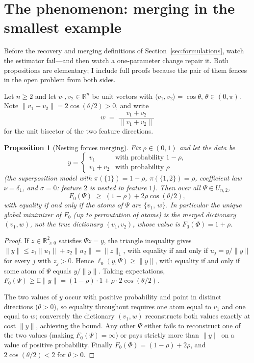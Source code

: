 \documentclass[11pt]{amsart}
\theoremstyle{plain}
\newtheorem{proposition}[theorem]{Proposition}
\theoremstyle{definition}
\newcommand{\R}{\mathbb{R}}
\newcommand{\E}{\mathbb{E}}
\begin{document}
\section{The phenomenon: merging in the smallest example}\label{sec:phenomenon}

Before the recovery and merging definitions of Section~\ref{sec:formulations}, watch the estimator fail---and then watch a one-parameter change repair it. Both propositions are elementary; I include full proofs because the pair of them fences in the open problem from both sides.

Let $n\ge2$ and let $v_1,v_2\in\R^n$ be unit vectors with $\langle v_1,v_2\rangle=\cos\theta$, $\theta\in(0,\pi)$. Note $\|v_1+v_2\| = 2\cos(\theta/2) > 0$, and write
\[
  w\;=\;\frac{v_1+v_2}{\lVert v_1+v_2\rVert}
\]
for the unit bisector of the two feature directions.

\begin{proposition}[Nesting forces merging]\label{prop:merge}
Fix $\rho\in(0,1)$ and let the data be
\[
  y=\begin{cases} v_1 & \text{with probability } 1-\rho,\\ v_1+v_2 & \text{with probability } \rho \end{cases}
\]
(the superposition model with $\pi(\{1\})=1-\rho$, $\pi(\{1,2\})=\rho$, coefficient law $\nu=\delta_1$, and $\sigma=0$: feature $2$ is nested in feature $1$). Then over all $\Psi\in U_{n,2}$,
\[
  F_0(\Psi)\;\ge\;(1-\rho)+2\rho\cos(\theta/2),
\]
with equality if and only if the atoms of $\Psi$ are $\{v_1,\,w\}$. In particular the unique global minimizer of $F_0$ (up to permutation of atoms) is the \emph{merged} dictionary $(v_1,w)$, not the true dictionary $(v_1,v_2)$, whose value is $F_0(\Phi)=1+\rho$.
\end{proposition}

\begin{proof}
If $z\in\R^2_{\ge0}$ satisfies $\Psi z=y$, the triangle inequality gives $\lVert y\rVert\le z_1\lVert u_1\rVert+z_2\lVert u_2\rVert=\lVert z\rVert_1$, with equality if and only if $u_j=y/\lVert y\rVert$ for every $j$ with $z_j>0$. Hence $\ell_0(y,\Psi)\ge\lVert y\rVert$, with equality if and only if some atom of $\Psi$ equals $y/\lVert y\rVert$. Taking expectations, $F_0(\Psi)\ge\E\lVert y\rVert=(1-\rho)\cdot1+\rho\cdot2\cos(\theta/2)$.

The two values of $y$ occur with positive probability and point in distinct directions ($\theta>0$), so equality throughout requires one atom equal to $v_1$ and one equal to $w$; conversely the dictionary $(v_1,w)$ reconstructs both values exactly at cost $\lVert y\rVert$, achieving the bound. Any other $\Psi$ either fails to reconstruct one of the two values (making $F_0(\Psi)=\infty$) or pays strictly more than $\lVert y\rVert$ on a value of positive probability. Finally $F_0(\Phi)=(1-\rho)+2\rho$, and $2\cos(\theta/2)<2$ for $\theta>0$.
\end{proof}
\end{document}
